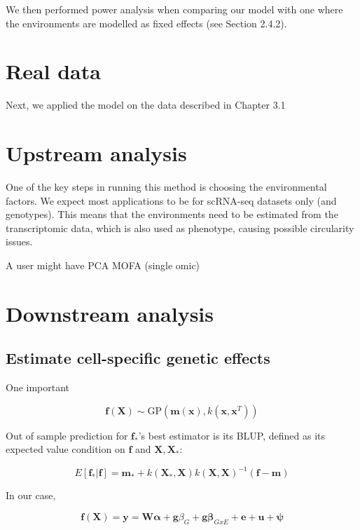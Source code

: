 We then performed power analysis when comparing our model with one where the environments are modelled as fixed effects (see Section 2.4.2).

\newpage

\section{Real data}

Next, we applied the model on the data described in Chapter 3.1

\section{Upstream analysis}

One of the key steps in running this method is choosing the environmental factors.
We expect most applications to be for scRNA-seq datasets only (and genotypes).
This means that the environments need to be estimated from the transcriptomic data, which is also used as phenotype, causing possible circularity issues.


A user might have 
PCA
MOFA (single omic)

\section{Downstream analysis} 

\subsection{Estimate cell-specific genetic effects}
One important 

\begin{equation}
    \mathbf{f}(\mathbf{X}) \sim \mathrm{GP}(\mathbf{m}(\mathbf{x}), k(\mathbf{x},\mathbf{x}^T))
\end{equation}

Out of sample prediction for $\mathbf{f}_*$'s best estimator is its BLUP, defined as its expected value condition on $\mathbf{f}$ and $\mathbf{X},\mathbf{X}_*$:

\begin{equation}
    E[\mathbf{f}_*|\mathbf{f}] = \mathbf{m}_* +k(\mathbf{X}_*,\mathbf{X})k(\mathbf{X},\mathbf{X})^{-1}(\mathbf{f}-\mathbf{m})
\end{equation}

In our case,

\begin{equation}
    \mathbf{f}(\mathbf{X}) = \mathbf{y} = \mathbf{W}\boldsymbol{\alpha}+\mathbf{g}\beta_G+\mathbf{g}\boldsymbol{\beta}_{GxE}+\mathbf{e} + \mathbf{u} + \boldsymbol{\psi}
\end{equation}

